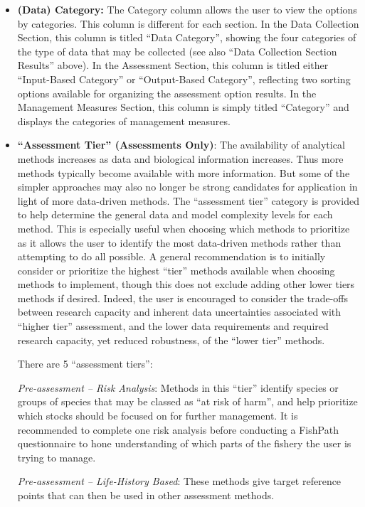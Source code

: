 \documentclass[
  11pt,
]{book}
\begin{document}
\begin{itemize}
\item
  \textbf{(Data) Category:} The Category column allows the user to view the options by categories. This column is different for each section. In the Data Collection Section, this column is titled ``Data Category'', showing the four categories of the type of data that may be collected (see also ``Data Collection Section Results'' above). In the Assessment Section, this column is titled either ``Input-Based Category'' or ``Output-Based Category'', reflecting two sorting options available for organizing the assessment option results. In the Management Measures Section, this column is simply titled ``Category'' and displays the categories of management measures.
\item
  \textbf{``Assessment Tier'' (Assessments Only)}: The availability of analytical methods increases as data and biological information increases. Thus more methods typically become available with more information. But some of the simpler approaches may also no longer be strong candidates for application in light of more data-driven methods. The ``assessment tier'' category is provided to help determine the general data and model complexity levels for each method. This is especially useful when choosing which methods to prioritize as it allows the user to identify the most data-driven methods rather than attempting to do all possible. A general recommendation is to initially consider or prioritize the highest ``tier'' methods available when choosing methods to implement, though this does not exclude adding other lower tiers methods if desired. Indeed, the user is encouraged to consider the trade-offs between research capacity and inherent data uncertainties associated with ``higher tier'' assessment, and the lower data requirements and required research capacity, yet reduced robustness, of the ``lower tier'' methods.

  There are 5 ``assessment tiers'':

  \emph{Pre-assessment -- Risk Analysis}: Methods in this ``tier'' identify species or groups of species that may be classed as ``at risk of harm'', and help prioritize which stocks should be focused on for further management. It is recommended to complete one risk analysis before conducting a FishPath questionnaire to hone understanding of which parts of the fishery the user is trying to manage.

  \emph{Pre-assessment -- Life-History Based}: These methods give target reference points that can then be used in other assessment methods.


\end{itemize}
\end{document}

